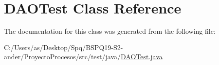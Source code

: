 \hypertarget{class_d_a_o_test}{}\section{D\+A\+O\+Test Class Reference}
\label{class_d_a_o_test}


The documentation for this class was generated from the following file\+:\begin{DoxyCompactItemize}
\item 
C\+:/\+Users/as/\+Desktop/\+Spq/\+B\+S\+P\+Q19-\/\+S2-\/ander/\+Proyecto\+Procesos/src/test/java/\mbox{\hyperlink{_d_a_o_test_8java}{D\+A\+O\+Test.\+java}}\end{DoxyCompactItemize}
